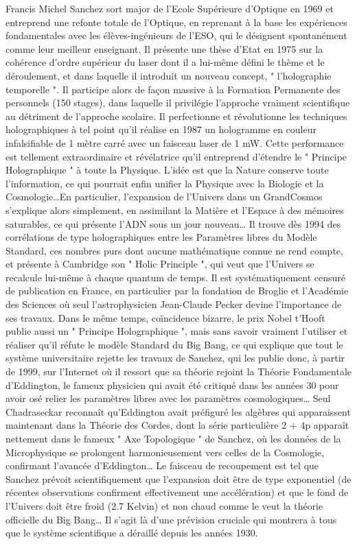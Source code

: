 \documentclass[a4paper,12pt]{article}
\begin{document}
Francis Michel Sanchez sort major de l’Ecole Supérieure d’Optique en 1969 et entreprend une refonte totale de l’Optique, en reprenant à la base les expériences fondamentales avec les élèves-ingénieurs de l’ESO, qui le désignent spontanément comme leur meilleur enseignant. Il présente une thèse d’Etat en 1975 sur la cohérence d’ordre supérieur du laser dont il a lui-même défini le thème et le déroulement, et dans laquelle il introduit un nouveau concept, " l’holographie temporelle ". Il participe alors de façon massive à la Formation Permanente des personnels (150 stages), dans laquelle il privilégie l’approche vraiment scientifique au détriment de l’approche scolaire. Il perfectionne et révolutionne les techniques holographiques à tel point qu’il réalise en 1987 un hologramme en couleur infalsifiable de 1 mètre carré avec un faisceau laser de 1 mW. Cette performance est tellement extraordinaire et révélatrice qu’il entreprend d’étendre le " Principe Holographique " à toute la Physique. L’idée est que la Nature conserve toute l’information, ce qui pourrait enfin unifier la Physique avec la Biologie et la Cosmologie…En particulier, l’expansion de l’Univers dans un GrandCosmos s’explique alors simplement, en assimilant la Matière et l’Espace à des mémoires saturables, ce qui présente l’ADN sous un jour nouveau… Il trouve dès 1994 des corrélations de type holographiques entre les Paramètres libres du Modèle Standard, ces nombres purs dont aucune mathématique connue ne rend compte, et présente à Cambridge son " Holic Principle ", qui veut que l’Univers se recalcule lui-même à chaque quantum de temps. Il est systématiquement censuré de publication en France, en particulier par la fondation de Broglie et l’Académie des Sciences où seul l’astrophysicien Jean-Claude Pecker devine l’importance de ses travaux. Dans le même temps, coïncidence bizarre, le prix Nobel t’Hooft publie aussi un " Principe Holographique ", mais sans savoir vraiment l’utiliser et réaliser qu’il réfute le modèle Standard du Big Bang, ce qui explique que tout le système universitaire rejette les travaux de Sanchez, qui les publie donc, à partir de 1999, sur l’Internet où il ressort que sa théorie rejoint la Théorie Fondamentale d’Eddington, le fameux physicien qui avait été critiqué dans les années 30 pour avoir osé relier les paramètres libres avec les paramètres cosmologiques… Seul Chadraseckar reconnaît qu’Eddington avait préfiguré les algèbres qui apparaissent maintenant dans la Théorie des Cordes, dont la série particulière 2 + 4p apparaît nettement dans le fameux " Axe Topologique " de Sanchez, où les données de la Microphysique se prolongent harmonieusement vers celles de la Cosmologie, confirmant l’avancée d’Eddington… Le faisceau de recoupement est tel que Sanchez prévoit scientifiquement que l’expansion doit être de type exponentiel (de récentes observations confirment effectivement une accélération) et que le fond de l’Univers doit être froid (2.7 Kelvin) et non chaud comme le veut la théorie officielle du Big Bang… Il s’agit là d’une prévision cruciale qui montrera à tous que le système scientifique a déraillé depuis les années 1930.
\end{document}
